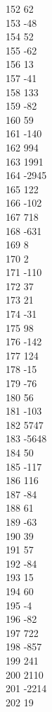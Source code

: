 { 152	62 \\
 153	-48 \\
 154	52 \\
 155	-62 \\
 156	13 \\
 157	-41 \\
 158	133 \\
 159	-82 \\
 160	59 \\
 161	-140 \\
 162	994 \\
 163	1991 \\
 164	-2945 \\
 165	122 \\
 166	-102 \\
 167	718 \\
 168	-631 \\
 169	8 \\
 170	2 \\
 171	-110 \\
 172	37 \\
 173	21 \\
 174	-31 \\
 175	98 \\
 176	-142 \\
 177	124 \\
 178	-15 \\
 179	-76 \\
 180	56 \\
 181	-103 \\
 182	5747 \\
 183	-5648 \\
 184	50 \\
 185	-117 \\
 186	116 \\
 187	-84 \\
 188	61 \\
 189	-63 \\
 190	39 \\
 191	57 \\
 192	-84 \\
 193	15 \\
 194	60 \\
 195	-4 \\
 196	-82 \\
 197	722 \\
 198	-857 \\
 199	241 \\
 200	2110 \\
 201	-2214 \\
 202	19 \\
}
